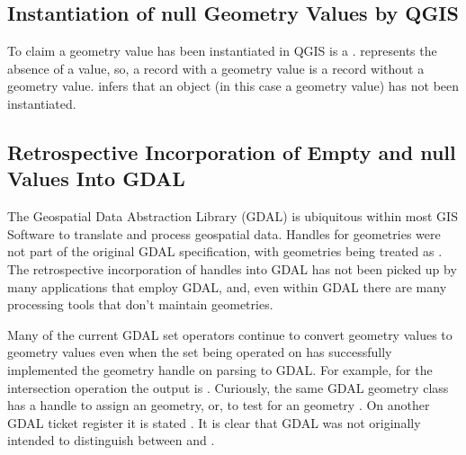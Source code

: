 \documentclass[a4paper,11pt,english]{sphinxmanual}
\begin{document}
\subsection{Instantiation of null Geometry Values by QGIS}
\label{\detokenize{QGISproblems:instantiation-of-null-geometry-values-by-qgis}}
To claim a  geometry value has been instantiated in QGIS is a .   represents the absence of a value, so, a record with a  geometry value is a record without a geometry value.   infers that an object (in this case a geometry value) has not been instantiated.


\subsection{Retrospective Incorporation of Empty and null Values Into GDAL}
\label{\detokenize{QGISproblems:retrospective-incorporation-of-empty-and-null-values-into-gdal}}
The Geospatial Data Abstraction Library (GDAL) is ubiquitous within most GIS Software to translate and process geospatial data.  Handles for  geometries were not part of the original GDAL specification, with  geometries being treated as .   The retrospective incorporation of  handles into GDAL has not been picked up by many applications that employ GDAL, and, even within GDAL there are many processing tools that don’t maintain  geometries.

Many of the current GDAL set operators continue to convert  geometry values to  geometry values even when the set being operated on has successfully implemented the  geometry handle on parsing to GDAL.  For example, for the intersection operation the output is  .  Curiously, the same GDAL geometry class has a handle to assign an  geometry, or, to test for an  geometry .  On another GDAL ticket register it is stated  . It is clear that GDAL was not originally intended to distinguish between  and .
\end{document}
